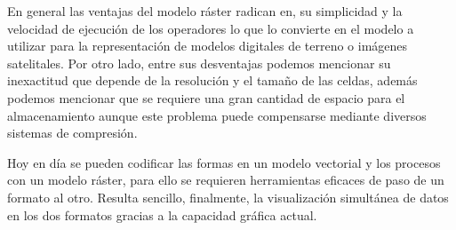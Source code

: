 En general las ventajas del modelo ráster radican en, su simplicidad y la velocidad de ejecución de
los operadores lo que lo convierte en el modelo a utilizar para la representación de modelos
digitales de terreno o imágenes satelitales. Por otro lado, entre sus desventajas podemos
mencionar su inexactitud que depende de la resolución y el tamaño de las celdas, además podemos
mencionar que se requiere una gran cantidad de espacio para el almacenamiento aunque este problema
puede compensarse mediante diversos sistemas de compresión.

Hoy en día se pueden codificar las formas en un modelo vectorial y los procesos con un modelo
ráster, para ello se requieren herramientas eficaces de paso de un formato al otro. Resulta
sencillo, finalmente, la visualización simultánea de datos en los dos formatos gracias a la
capacidad gráfica actual\cite{fAlonsoSig2006}.
